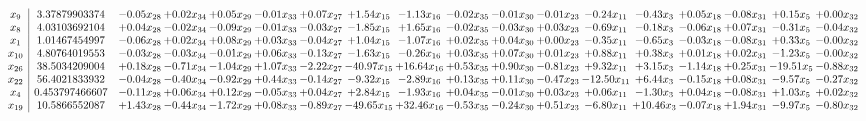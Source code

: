 \documentclass[9pt]{article}
\begin{document}
 \[\begin{array}{c| c c@{\hskip 2pt} c@{\hskip 2pt} c@{\hskip 2pt} c@{\hskip 2pt} c@{\hskip 2pt} c@{\hskip 2pt} c@{\hskip 2pt} c@{\hskip 2pt} c@{\hskip 2pt} c@{\hskip 2pt} c@{\hskip 2pt} c@{\hskip 2pt} c@{\hskip 2pt} c@{\hskip 2pt} c@{\hskip 2pt} c@{\hskip 2pt} }
 x_{9}   &  3.37879903374 & -0.05 x_{28} & +  0.02 x_{34} & +  0.05 x_{29} & -0.01 x_{33} & +  0.07 x_{27} & +  1.54 x_{15} & -1.13 x_{16} & -0.02 x_{35} & -0.01 x_{30} & -0.01 x_{23} & -0.24 x_{11} & -0.43 x_{3} & +  0.05 x_{18} & -0.08 x_{31} & +  0.15 x_{5} & +  0.00 x_{32}\\
 x_{8}   &  4.03103692104 & +  0.04 x_{28} & -0.02 x_{34} & -0.09 x_{29} & -0.01 x_{33} & -0.03 x_{27} & -1.85 x_{15} & +  1.65 x_{16} & -0.02 x_{35} & -0.03 x_{30} & +  0.03 x_{23} & -0.69 x_{11} & -0.18 x_{3} & -0.06 x_{18} & +  0.07 x_{31} & -0.31 x_{5} & -0.04 x_{32}\\
 x_{1}   &  1.01467454997 & -0.06 x_{28} & +  0.02 x_{34} & +  0.08 x_{29} & +  0.03 x_{33} & -0.04 x_{27} & +  1.04 x_{15} & -1.07 x_{16} & +  0.02 x_{35} & +  0.04 x_{30} & +  0.00 x_{23} & -0.35 x_{11} & -0.65 x_{3} & -0.03 x_{18} & -0.08 x_{31} & +  0.33 x_{5} & -0.00 x_{32}\\
 x_{10}   &  4.80764019553 & -0.03 x_{28} & -0.03 x_{34} & -0.01 x_{29} & +  0.06 x_{33} & -0.13 x_{27} & -1.63 x_{15} & -0.26 x_{16} & +  0.03 x_{35} & +  0.07 x_{30} & +  0.01 x_{23} & +  0.88 x_{11} & +  0.38 x_{3} & +  0.01 x_{18} & +  0.02 x_{31} & -1.23 x_{5} & -0.00 x_{32}\\
 x_{26}   &  38.5034209004 & +  0.18 x_{28} & -0.71 x_{34} & -1.04 x_{29} & +  1.07 x_{33} & -2.22 x_{27} & -40.97 x_{15} & + 16.64 x_{16} & +  0.53 x_{35} & +  0.90 x_{30} & -0.81 x_{23} & +  9.32 x_{11} & +  3.15 x_{3} & -1.14 x_{18} & +  0.25 x_{31} & -19.51 x_{5} & -0.88 x_{32}\\
 x_{22}   &  56.4021833932 & -0.04 x_{28} & -0.40 x_{34} & -0.92 x_{29} & +  0.44 x_{33} & -0.14 x_{27} & -9.32 x_{15} & -2.89 x_{16} & +  0.13 x_{35} & +  0.11 x_{30} & -0.47 x_{23} & -12.50 x_{11} & +  6.44 x_{3} & -0.15 x_{18} & +  0.08 x_{31} & -9.57 x_{5} & -0.27 x_{32}\\
 x_{4}   &  0.453797466607 & -0.11 x_{28} & +  0.06 x_{34} & +  0.12 x_{29} & -0.05 x_{33} & +  0.04 x_{27} & +  2.84 x_{15} & -1.93 x_{16} & +  0.04 x_{35} & -0.01 x_{30} & +  0.03 x_{23} & +  0.06 x_{11} & -1.30 x_{3} & +  0.04 x_{18} & -0.08 x_{31} & +  1.03 x_{5} & +  0.02 x_{32}\\
 x_{19}   &  10.5866552087 & +  1.43 x_{28} & -0.44 x_{34} & -1.72 x_{29} & +  0.08 x_{33} & -0.89 x_{27} & -49.65 x_{15} & + 32.46 x_{16} & -0.53 x_{35} & -0.24 x_{30} & +  0.51 x_{23} & -6.80 x_{11} & + 10.46 x_{3} & -0.07 x_{18} & +  1.94 x_{31} & -9.97 x_{5} & -0.80 x_{32}\\

\end{array}\]
\end{document}
